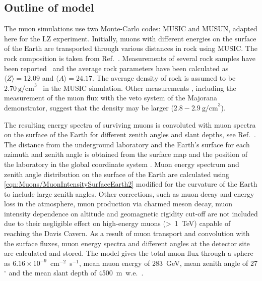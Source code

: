 \subsection{Outline of model}\label{sec:Muons/ModelOutline}
The muon simulations use two Monte-Carlo codes: MUSIC and MUSUN, adapted here for the LZ experiment. Initially, muons with different energies on the surface of the Earth are transported through various distances in rock using MUSIC. The rock composition is taken from Ref.~\cite{mei,zhang}. Measurements of several rock samples have been reported~\cite{mei,zhang} and the average rock parameters have been calculated as $\langle Z\rangle=12.09$ and $\langle A\rangle=24.17$. The average density of rock is assumed to be $2.70~\text{g/cm}^3$~\cite{zhang} in the MUSIC simulation. Other measurements \cite{Heise:2021eym}, including the measurement of the muon flux with the veto system of the Majorana demonstrator, suggest that the density may be larger ($2.8-2.9~\text{g/cm}^3$\cite{majorana}).

The resulting energy spectra of surviving muons is convoluted with muon spectra on the surface of the Earth for different zenith angles and slant depths, see Ref.~\cite{musun}. The distance from the underground laboratory and the Earth's surface for each azimuth and zenith angle is obtained from the surface map and the position of the laboratory in the global coordinate system \cite{richardson}.
Muon energy spectrum and zenith angle distribution on the surface of the Earth are calculated using \autoref{eqn:Muons/MuonIntensitySurfaceEarth2} modified for the curvature of the Earth to include large zenith angles. Other corrections, such as muon decay and energy loss in the atmosphere, muon production via charmed meson decay, muon intensity dependence on altitude and geomagnetic rigidity cut-off are not included due to their negligible effect on high-energy muons (\textgreater~1~TeV) capable of reaching the Davis Cavern.
As a result of muon transport and convolution with the surface fluxes, muon energy spectra and different angles at the detector site are calculated and stored. The model gives the total muon flux through a sphere as $6.16\times10^{-9}$~cm$^{-2}$~s$^{-1}$, mean muon energy of 283~GeV, mean zenith angle of 27$^{\circ}$ and the mean slant depth of 4500~m~w.e.~\cite{musun-lz}.

